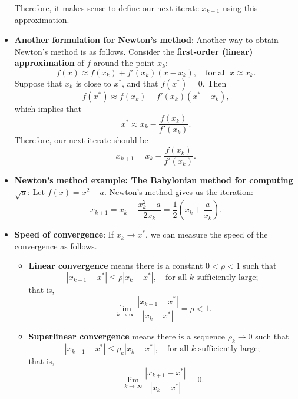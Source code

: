 \documentclass{report}
\begin{document}
\begin{itemize}
    Therefore, it makes sense to define our next iterate $x_{k+1}$ using this approximation.
\item \textbf{Another formulation for Newton's method}:
    Another way to obtain Newton's method is as follows. Consider the \textbf{first-order (linear) approximation} of $f$ around the point $x_k$:
    $$f(x) \approx f(x_k) + f'(x_k)(x - x_k), \quad \text{for all $x \approx x_k$}.$$
    Suppose that $x_k$ is close to $x^*$, and that $f(x^*) = 0$. Then
    $$f(x^*) \approx f(x_k) + f'(x_k)(x^* - x_k),$$
    which implies that
    $$x^* \approx x_k - \frac{f(x_k)}{f'(x_k)}.$$
    Therefore, our next iterate should be 
    $$x_{k+1} = x_k - \frac{f(x_k)}{f'(x_k)}.$$
\item \textbf{Newton's method example: The Babylonian method for computing $\sqrt{a}$}:
    Let $f(x) = x^2 - a$. Newton's method gives us the iteration:
$$ x_{k+1} = x_k - \frac{x_k^2 - a}{2x_k} = \frac{1}{2}\left(x_k + \frac{a}{x_k}\right).$$
\item \textbf{Speed of convergence}:
    If \( x_k \to x^* \), we can measure the speed of the convergence as follows.
    \begin{itemize}
        \item  \textbf{Linear convergence} means there is a constant \( 0 < \rho < 1 \) such that
        \[
            \left|x_{k+1}-x^*\right| \leq \rho \left|x_k - x^*\right|, \quad \text{for all } k \text{ sufficiently large};
        \]
        that is,
        \[
            \lim_{k \to \infty} \frac{\left|x_{k+1}-x^*\right|}{\left|x_k - x^*\right|} = \rho < 1.
        \]

        \item \textbf{Superlinear convergence} means there is a sequence \( \rho_k \to 0 \) such that
        \[
            \left|x_{k+1}-x^*\right| \leq \rho_k \left|x_k - x^*\right|, \quad \text{for all } k \text{ sufficiently large};
        \]
        that is,
        \[
            \lim_{k \to \infty} \frac{\left|x_{k+1}-x^*\right|}{\left|x_k - x^*\right|} = 0.
        \]


\end{itemize}
\end{itemize}
\end{document}
